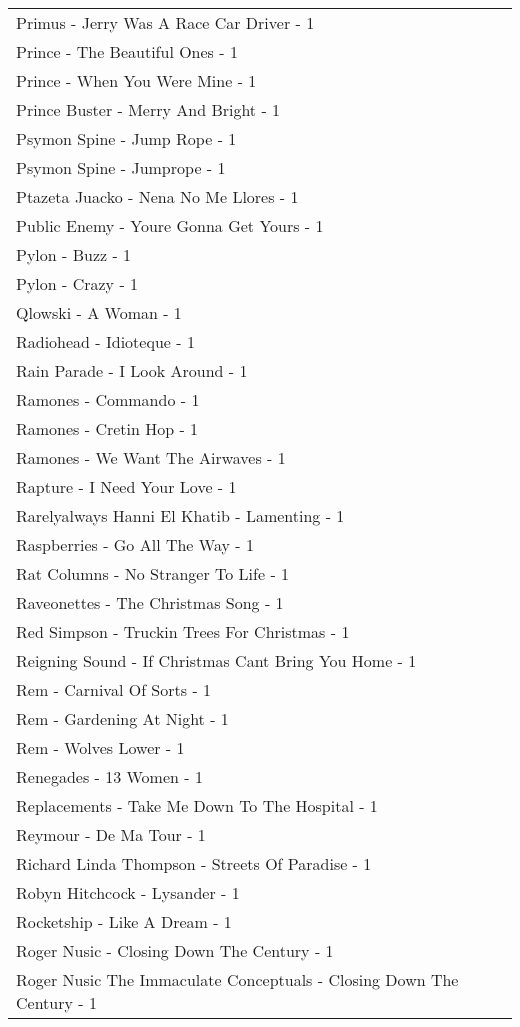 \documentclass[
]{article}
\begin{document}
\begin{longtable}{l}
Primus - Jerry Was A Race Car Driver - 1 \\ 
Prince - The Beautiful Ones - 1 \\ 
Prince - When You Were Mine - 1 \\ 
Prince Buster - Merry And Bright - 1 \\ 
Psymon Spine - Jump Rope - 1 \\ 
Psymon Spine - Jumprope - 1 \\ 
Ptazeta Juacko - Nena No Me Llores - 1 \\ 
Public Enemy - Youre Gonna Get Yours - 1 \\ 
Pylon - Buzz - 1 \\ 
Pylon - Crazy - 1 \\ 
Qlowski - A Woman - 1 \\ 
Radiohead - Idioteque - 1 \\ 
Rain Parade - I Look Around - 1 \\ 
Ramones - Commando - 1 \\ 
Ramones - Cretin Hop - 1 \\ 
Ramones - We Want The Airwaves - 1 \\ 
Rapture - I Need Your Love - 1 \\ 
Rarelyalways Hanni El Khatib - Lamenting - 1 \\ 
Raspberries - Go All The Way - 1 \\ 
Rat Columns - No Stranger To Life - 1 \\ 
Raveonettes - The Christmas Song - 1 \\ 
Red Simpson - Truckin Trees For Christmas - 1 \\ 
Reigning Sound - If Christmas Cant Bring You Home - 1 \\ 
Rem - Carnival Of Sorts - 1 \\ 
Rem - Gardening At Night - 1 \\ 
Rem - Wolves Lower - 1 \\ 
Renegades - 13 Women - 1 \\ 
Replacements - Take Me Down To The Hospital - 1 \\ 
Reymour - De Ma Tour - 1 \\ 
Richard Linda Thompson - Streets Of Paradise - 1 \\ 
Robyn Hitchcock - Lysander - 1 \\ 
Rocketship - Like A Dream - 1 \\ 
Roger Nusic - Closing Down The Century - 1 \\ 
Roger Nusic The Immaculate Conceptuals - Closing Down The Century - 1 \\ 

\end{longtable}
\end{document}
